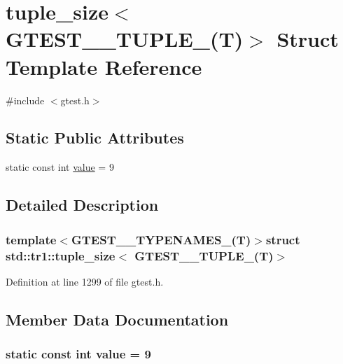 \hypertarget{structstd_1_1tr1_1_1tuple__size_3_01GTEST__9__TUPLE___07T_08_4}{\section{tuple\-\_\-size$<$ \-G\-T\-E\-S\-T\-\_\-\_\-\-T\-U\-P\-L\-E\-\_\-(\-T)$>$ \-Struct \-Template \-Reference}
\label{d3/d56/structstd_1_1tr1_1_1tuple__size_3_01GTEST__9__TUPLE___07T_08_4}
}


{\ttfamily \#include $<$gtest.\-h$>$}

\subsection*{\-Static \-Public \-Attributes}
\begin{DoxyCompactItemize}
\item 
static const int \hyperlink{structstd_1_1tr1_1_1tuple__size_3_01GTEST__9__TUPLE___07T_08_4_a3851384a21258869159d444f38396c70}{value} = 9
\end{DoxyCompactItemize}


\subsection{\-Detailed \-Description}
\subsubsection*{template$<$\-G\-T\-E\-S\-T\-\_\-\_\-\-T\-Y\-P\-E\-N\-A\-M\-E\-S\-\_\-(\-T)$>$struct std\-::tr1\-::tuple\-\_\-size$<$ G\-T\-E\-S\-T\-\_\-\_\-\-T\-U\-P\-L\-E\-\_\-(\-T)$>$}



\-Definition at line 1299 of file gtest.\-h.



\subsection{\-Member \-Data \-Documentation}
\hypertarget{structstd_1_1tr1_1_1tuple__size_3_01GTEST__9__TUPLE___07T_08_4_a3851384a21258869159d444f38396c70}{
\subsubsection[{value}]{\setlength{\rightskip}{0pt plus 5cm}static const int {\bf value} = 9}}\label{d3/d56/structstd_1_1tr1_1_1tuple__size_3_01GTEST__9__TUPLE___07T_08_4_a3851384a21258869159d444f38396c70}


